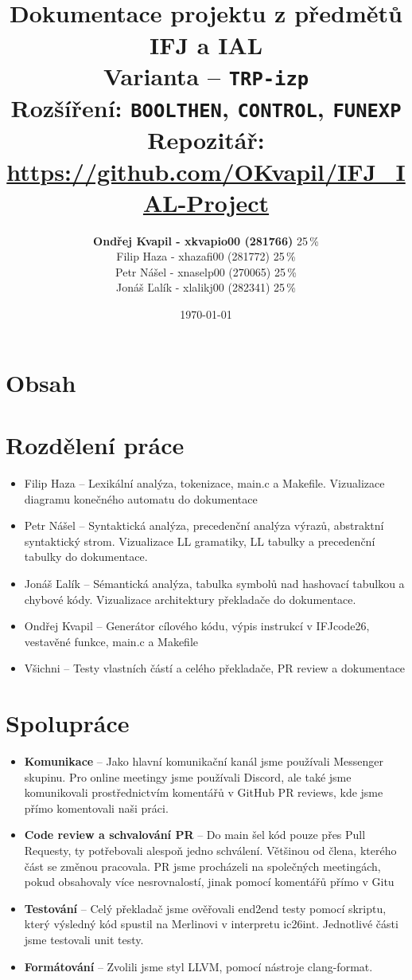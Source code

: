 \documentclass[]{ifjclass}
\title{
    \logo\\[0.8cm]
    Dokumentace projektu z předmětů IFJ a IAL\\[1cm]
    \Large Varianta -- \texttt{TRP-izp}\\[0.25cm]
    \large Rozšíření: \texttt{BOOLTHEN}, \texttt{CONTROL}, \texttt{FUNEXP}\\[0.4cm]
    \normalsize Repozitář: \url{https://github.com/OKvapil/IFJ_IAL-Project}
}
\author{\textbf{Ondřej Kvapil - xkvapio00 (281766)} 25\,\% \\ Filip Haza - xhazafi00 (281772) 25\,\% \\ Petr Nášel - xnaselp00 (270065) 25\,\% \\ Jonáš Ľalík - xlalikj00 (282341) 25\,\%}
\date{\vspace{0.75cm}\today}
\begin{document}
	\maketitle
    \newpage   
    \section{Obsah}
	\tableofcontents
    \newpage

    \section{Rozdělení práce}
        \begin{itemize}
        \item Filip Haza -- Lexikální analýza, tokenizace, main.c a Makefile. Vizualizace diagramu konečného automatu do dokumentace
        \item Petr Nášel -- Syntaktická analýza, precedenční analýza výrazů, abstraktní syntaktický strom. Vizualizace LL gramatiky, LL tabulky a precedenční tabulky do dokumentace.
        \item Jonáš Ľalík -- Sémantická analýza, tabulka symbolů nad hashovací tabulkou a chybové kódy. Vizualizace architektury překladače do dokumentace.
        \item Ondřej Kvapil -- Generátor cílového kódu, výpis instrukcí v IFJcode26, vestavěné funkce, main.c a Makefile
        \item Všichni -- Testy vlastních částí a celého překladače, PR review a dokumentace
        \end{itemize}

    \section{Spolupráce}
        \begin{itemize}
        \item \textbf{Komunikace} -- Jako hlavní komunikační kanál jsme používali Messenger skupinu. Pro online meetingy jsme používali Discord, ale také jsme komunikovali prostřednictvím komentářů v GitHub PR reviews, kde jsme přímo komentovali naši práci.
        \item \textbf{Code review a schvalování PR} -- Do main šel kód pouze přes Pull Requesty, ty potřebovali alespoň jedno schválení. Většinou od člena, kterého část se změnou pracovala. PR jsme procházeli na společných meetingách, pokud obsahovaly více nesrovnalostí, jinak pomocí komentářů přímo v Gitu
        \item \textbf{Testování} -- Celý překladač jsme ověřovali end2end testy pomocí skriptu, který výsledný kód spustil na Merlinovi v interpretu ic26int. Jednotlivé části jsme testovali unit testy.
        \item \textbf{Formátování} -- Zvolili jsme styl LLVM, pomocí nástroje clang-format.
        \end{itemize}
    \newpage
\end{document}
